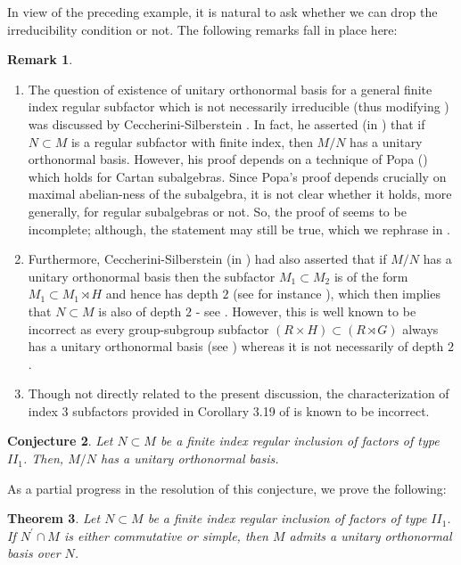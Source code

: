 \documentclass{amsart}
\newtheorem{theorem}{Theorem}[section]
\newtheorem{conjecture}[theorem]{Conjecture}
\theoremstyle{definition}
\theoremstyle{theorem}
\newtheorem{remark}[theorem]{Remark}
\begin{document}
  In view of the preceding example, it is natural to ask whether we
  can drop the irreducibility condition or not. The following remarks fall in
  place here:
\begin{remark}\label{silmistake}
  \begin{enumerate}
\item The question of existence of unitary orthonormal basis for a
  general finite index regular subfactor which is not necessarily
  irreducible (thus modifying ) was discussed by
  Ceccherini-Silberstein \cite{S}. In fact, he asserted (in \cite[Theorem
    4.5]{S}) that if $N\subset M$ is a regular subfactor with finite
  index, then $M/N$ has a unitary orthonormal basis. However, his
  proof depends on a technique of Popa (\cite[Theorem 2.3]{Pop3})
  which holds for Cartan subalgebras. Since Popa's proof depends
  crucially on maximal abelian-ness of the subalgebra, it is not clear
  whether it holds, more generally, for regular subalgebras or
  not. So, the proof of \cite[Theorem 4.5]{S} seems to be incomplete;
  although, the statement may still be true, which we rephrase in
  .
    \item Furthermore, Ceccherini-Silberstein (in \cite[Theorem 4.7]{S}) had
      also asserted that if $M/N$ has a unitary orthonormal basis then
      the subfactor $M_1\subset M_2$ is of the form $M_1 \subset M_1
      \rtimes H$ and {hence has depth $2$ (see for instance
        \cite{NV1})}, which then implies that $N \subset M$ is also of
      depth $2$ - see .  However, this is well
      known to be incorrect as every group-subgroup subfactor
      $(R\times H)\subset (R\rtimes G)$ always has a unitary
      orthonormal basis (see ) whereas it is
      not necessarily of depth $2$.
      \item Though not directly related to the present discussion, the
        characterization of index 3 subfactors provided in Corollary
        3.19 of \cite{S} is known to be incorrect.
\end{enumerate}
\end{remark}
\color{black}

\begin{conjecture}\label{regular-u-onb}
Let $N\subset M$ be a finite index regular inclusion of factors of
type $II_1$.  Then, $M/N$ has a unitary orthonormal basis.
\end{conjecture}

As a partial progress in the resolution of this conjecture, we prove
the following:
\begin{theorem}\label{regularunitary}
Let $N\subset M$ be a finite index regular inclusion of factors of
type $II_1$. If $N^{\prime}\cap M$ is either commutative or simple, then
$M$ admits a unitary orthonormal basis over $N$.
\end{theorem}
\end{document}
